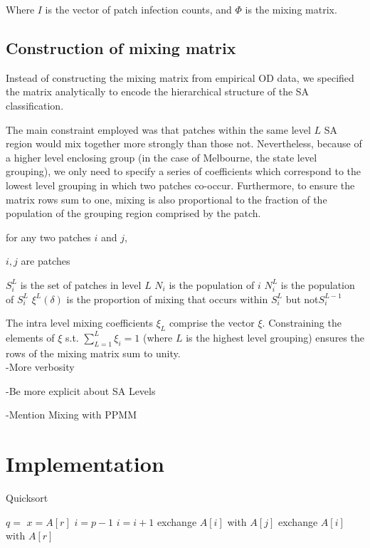 \documentclass[
  letterpaper,
  DIV=11,
  numbers=noendperiod]{scrreprt}
\begin{document}
Where \(I\) is the vector of patch infection counts, and \(\Phi\) is the
mixing matrix.

\hypertarget{construction-of-mixing-matrix}{%
\subsection{Construction of mixing
matrix}\label{construction-of-mixing-matrix}}

Instead of constructing the mixing matrix from empirical OD data, we
specified the matrix analytically to encode the hierarchical structure
of the SA classification.

The main constraint employed was that patches within the same level
\(L\) SA region would mix together more strongly than those not.
Nevertheless, because of a higher level enclosing group (in the case of
Melbourne, the state level grouping), we only need to specify a series
of coefficients which correspond to the lowest level grouping in which
two patches co-occur. Furthermore, to ensure the matrix rows sum to one,
mixing is also proportional to the fraction of the population of the
grouping region comprised by the patch.

for any two patches \(i\) and \(j\),

\(i, j\) are patches

\(S_{i}^{L}\) is the set of patches in level \(L\) \(N_i\) is the
population of \(i\) \(N_{i}^{L}\) is the population of \(S_{i}^{L}\)
\(\xi^{L}(\delta)\) is the proportion of mixing that occurs within
\(S_{i}^{L}\) but not\(S_{i}^{L-1}\)

The intra level mixing coefficients \(\xi_L\) comprise the vector
\(\xi\). Constraining the elements of \(\xi\) s.t.
\(\sum\limits_{L = 1}^{L} \xi_i = 1\) (where \(L\) is the highest level
grouping) ensures the rows of the mixing matrix sum to unity.\\

-More verbosity

-Be more explicit about SA Levels

-Mention Mixing with PPMM

\hypertarget{implementation}{%
\section{Implementation}\label{implementation}}

\begin{algorithm}[htb!]
\caption{Quicksort}
\label{alg-quicksort}
\begin{algorithmic}[1]
    \State $q = $ 
    \State {}
    \State {}
  \EndIf
\EndProcedure
{}
  \State $x = A[r]$
  \State $i = p - 1$
      \State $i = i + 1$
      \State exchange
      $A[i]$ with     $A[j]$
    \EndIf
    \State exchange $A[i]$ with $A[r]$
  \EndFor
\EndProcedure
\end{algorithmic}
\end{algorithm}
\end{document}
